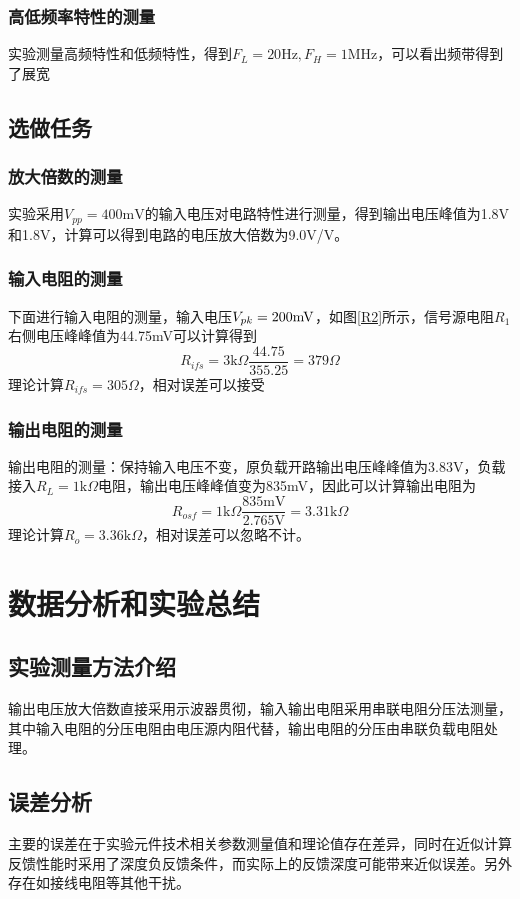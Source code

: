 \documentclass[UTF8,a4paper]{article}
\begin{document}
\subsubsection{高低频率特性的测量}
实验测量高频特性和低频特性，得到$F_L=20\mathrm{Hz},F_H=1\mathrm{MHz}$，可以看出频带得到了展宽

\subsection{选做任务}
\subsubsection{放大倍数的测量}
实验采用$V_{pp}=400\mathrm{mV}$的输入电压对电路特性进行测量，得到输出电压峰值为1.8V和1.8V，计算可以得到电路的电压放大倍数为9.0V/V。
\subsubsection{输入电阻的测量}
下面进行输入电阻的测量，输入电压$V_{pk}=200\rm{mV}$，如图\ref{R2}所示，信号源电阻$R_1$右侧电压峰峰值为44.75mV可以计算得到
$$R_{ifs}=3\mathrm{k}\Omega\frac{44.75}{355.25}=379\Omega$$理论计算$R_{ifs}=305\Omega$，相对误差可以接受
\subsubsection{输出电阻的测量}
输出电阻的测量：保持输入电压不变，原负载开路输出电压峰峰值为3.83V，负载接入$R_L=1\mathrm{k}\Omega$电阻，输出电压峰峰值变为835mV，因此可以计算输出电阻为
$$R_{osf}=1\mathrm{k}\Omega\frac{835\mathrm{mV}}{2.765\mathrm{V}}=3.31\mathrm{k}\Omega$$
理论计算$R_o=3.36\mathrm{k}\Omega$，相对误差可以忽略不计。
\section{数据分析和实验总结}
\subsection{实验测量方法介绍}
输出电压放大倍数直接采用示波器贯彻，输入输出电阻采用串联电阻分压法测量，其中输入电阻的分压电阻由电压源内阻代替，输出电阻的分压由串联负载电阻处理。
\subsection{误差分析}
主要的误差在于实验元件技术相关参数测量值和理论值存在差异，同时在近似计算反馈性能时采用了深度负反馈条件，而实际上的反馈深度可能带来近似误差。另外存在如接线电阻等其他干扰。
\end{document}
